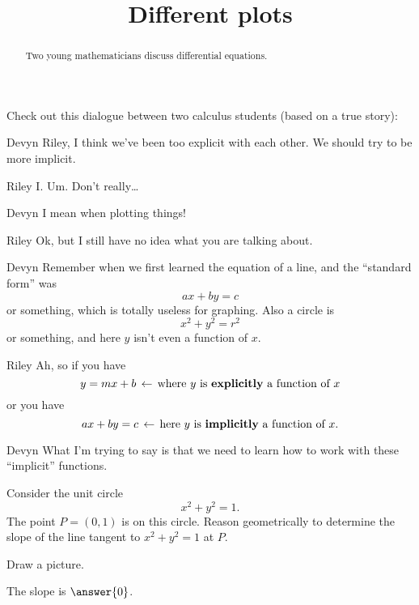 \documentclass{ximera}
\title[Break-Ground:]{Different plots}
\begin{document}
\begin{abstract}
  Two young mathematicians discuss differential equations.
\end{abstract}
\maketitle








Check out this dialogue between two calculus students (based on a true
story):

\begin{dialogue}
\item[Devyn] Riley, I think we've been too explicit with each
  other. We should try to be more implicit.
\item[Riley] I. Um. Don't really\dots
\item[Devyn] I mean when plotting things!
\item[Riley] Ok, but I still have no idea what you are talking about.
\item[Devyn] Remember when we first learned the equation of a line, and the ``standard form'' was
  \[
  ax+by = c
  \]
  or something, which is totally useless for graphing. Also a circle is
  \[
  x^2 + y^2 = r^2
  \]
  or something, and here $y$ isn't even a function of
  $x$. 
\item[Riley] Ah, so if you have
  \[
  y = mx + b \,\leftarrow \,\text{where $y$ is \textbf{explicitly} a function of $x$}
  \]
  or you have
    \[
  ax + by = c\,\leftarrow\, \text{here $y$ is \textbf{implicitly} a function of $x$.}
  \]
\item[Devyn] What I'm trying to say is that we need to learn how to
  work with these ``implicit'' functions. 
\end{dialogue}

\begin{problem}
  Consider the unit circle
  \[
  x^2 + y^2 = 1.
  \]
  The point $P=(0,1)$ is on this circle. Reason geometrically to
  determine the slope of the line tangent to $x^2 + y^2 = 1$ at
  $P$.
  \begin{hint}
    Draw a picture.
  \end{hint}
  \begin{prompt}
    The slope is $\answer{0}$.
  \end{prompt}
\end{problem}
\end{document}
